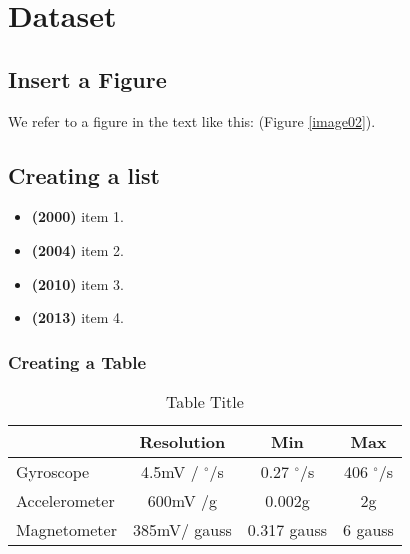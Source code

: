 
\chapter{Dataset} %

\ifpdf
    \graphicspath{{3_chapter3/figures/PNG/}{3_chapter3/figures/PDF/}{3_chapter3/figures/}}
\else
    \graphicspath{{3_chapter3/figures/EPS/}{3_chapter3/figures/}}
\fi





\section{Insert a Figure}
 We refer to a figure in the text like this:  (Figure \ref{image02}).
 
 


\section{Creating a list}

\begin{itemize} \itemsep1pt \parskip0pt 
\item \textbf{(2000)} item 1. 
\item \textbf{(2004)} item 2. 
\item \textbf{(2010)} item 3. 
\item \textbf{(2013)} item 4. 
\end{itemize}


\subsection{Creating a Table}

\begin{table}[htpp]
\caption{Table Title}
\begin{center}
\begin{tabular}{| p{3cm} | c | c | c |}
\hline 
 & Resolution & Min & Max \\ \hline 
Gyroscope & 4.5mV / {$^{\circ}$}/s & 0.27 $^{\circ}$/s & 406 $^{\circ}$/s \\ \hline
Accelerometer & 600mV /g &  0.002g & 2g \\ \hline
Magnetometer & 385mV/ gauss & 0.317 gauss & 6 gauss \\ \hline
\end{tabular}
\end{center}
\label{Sensors' Resolution}
\end{table}%


